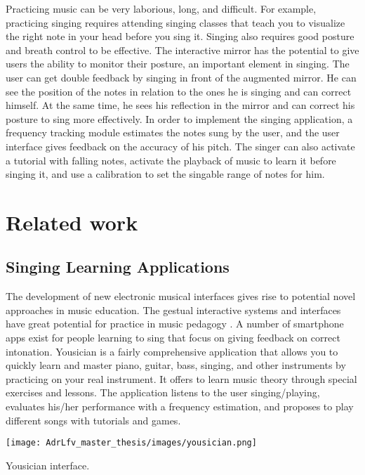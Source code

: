 Practicing music can be very laborious, long, and difficult. For example, practicing singing requires attending singing classes that teach you to visualize the right note in your head before you sing it. Singing also requires good posture and breath control to be effective.
The interactive mirror has the potential to give users the ability to monitor their posture, an important element in singing. The user can get double feedback by singing in front of the augmented mirror. He can see the position of the notes in relation to the ones he is singing and can correct himself.
At the same time, he sees his reflection in the mirror and can correct his posture to sing more effectively. In order to implement the singing application, a frequency tracking module estimates the notes sung by the user, and the user interface gives feedback on the accuracy of his pitch.
The singer can also activate a tutorial with falling notes, activate the playback of music to learn it before singing it, and use a calibration to set the singable range of notes for him.

\section{Related work}

\subsection{Singing Learning Applications}

The development of new electronic musical interfaces gives rise to potential novel approaches in music education. The gestual interactive systems and interfaces have great potential for practice in music pedagogy \cite{farrugia2015tunes}.
A number of smartphone apps exist for people learning to sing that focus on giving feedback on correct intonation.
Yousician is a fairly comprehensive application that allows you to quickly learn and master piano, guitar, bass, singing, and other instruments by practicing on your real instrument.
It offers to learn music theory through special exercises and lessons. The application listens to the user singing/playing, evaluates his/her performance with a frequency estimation, and proposes to play different songs with tutorials and games. 

\begin{marginfigure}
    \centering
    \texttt{[image: AdrLfv\_master\_thesis/images/yousician.png]}
    \caption{Yousician interface.}
    \label{fig:yousician}
\end{marginfigure}

